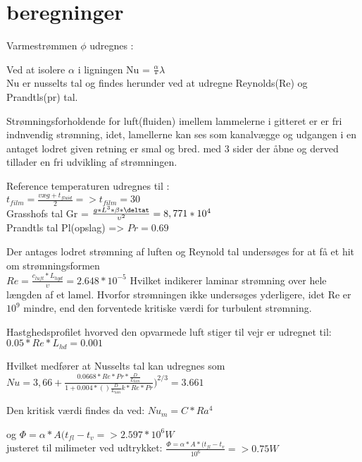 \section{beregninger}

Varmestrømmen $\phi$ udregnes : 

Ved at isolere $\alpha$ i ligningen Nu = $\frac{\alpha}*{\lambda}$ \\
Nu er nusselts tal og findes herunder ved at udregne Reynolds(Re) og Prandtls(pr) tal.


Strømningsforholdende for luft(fluiden) imellem lammelerne i gitteret er er fri indnvendig strømning, idet, lamellerne kan ses som kanalvægge og udgangen i en antaget lodret given retning er smal og bred. med 3 sider der åbne og derved tillader en fri udvikling af strømningen. 

Reference temperaturen udregnes til : 
\\$t_{film} = \frac{{væg}+t_{fluid}}{2} => t_{film}=30$
\\Grasshofs tal Gr = $\frac{g*L^3*\beta*{\deltat}}{\upsilon^2} = 8,771*10^4$
\\Prandtls tal Pl(opslag) => $Pr=0.69$


Der antages lodret  strømning af luften og Reynold tal undersøges for at få et hit om strømningsformen\\

$Re = \frac{c_{luft}*L_{hyd}}{\upsilon} = 2.648*10^{-5}$
Hvilket indikerer laminar strømning over hele længden af et lamel. Hvorfor strømningen ikke undersøges yderligere, idet Re er $10^9$ mindre, end den forventede kritiske værdi for turbulent strømning.

Hastghedsprofilet hvorved den opvarmede luft stiger til vejr er udregnet til: 
$0.05*Re*L_{hd} = 0.001 $

Hvilket medfører at Nusselts tal kan udregnes som \\ 
$Nu = 3,66+ \frac{0.0668*Re*Pr*\frac{D}{L_{lam}}}{1+0.004*()\frac{D}{L_{lam}}k *Re*Pr})^{2/3} = 3.661$


Den kritisk værdi findes da ved: $Nu_m = C*Ra^4$

og $ \Phi = \alpha*A(t_{fl}-t_v =>2.597*10^6 W $\\ 
justeret til milimeter ved udtrykket: $\frac{\Phi = \alpha*A*(t_{fl}-t_v}{10^6} =>0.75 W$
